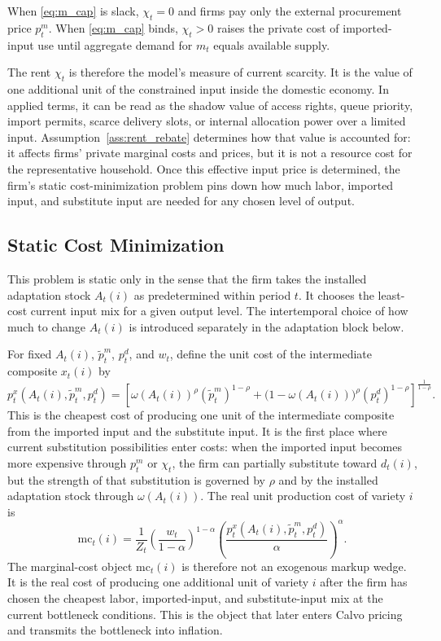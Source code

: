﻿\documentclass[12pt]{article}
\theoremstyle{remark}
\newcommand{\mc}{\mathrm{mc}}
\begin{document}
When \eqref{eq:m_cap} is slack, $\chi_t=0$ and firms pay only the external procurement price
$p_t^m$. When \eqref{eq:m_cap} binds, $\chi_t>0$ raises the private cost of imported-input use until
aggregate demand for $m_t$ equals available supply.

The rent $\chi_t$ is therefore the model's measure of current scarcity. It is the value of one
additional unit of the constrained input inside the domestic economy. In applied terms, it can be
read as the shadow value of access rights, queue priority, import permits, scarce delivery slots,
or internal allocation power over a limited input. Assumption~\ref{ass:rent_rebate} determines how
that value is accounted for: it affects firms' private marginal costs and prices, but it is not a
resource cost for the representative household. Once this effective input price is determined, the
firm's static cost-minimization problem pins down how much labor, imported input, and substitute
input are needed for any chosen level of output.

\subsection{Static Cost Minimization}

This problem is static only in the sense that the firm takes the installed adaptation stock
$A_t(i)$ as predetermined within period $t$. It chooses the least-cost current input mix for a given
output level. The intertemporal choice of how much to change $A_t(i)$ is introduced separately in
the adaptation block below.

For fixed $A_t(i)$, $\tilde p_t^m$, $p_t^d$, and $w_t$, define the unit cost of the intermediate
composite $x_t(i)$ by
\begin{equation}
    p_t^x(A_t(i),\tilde p_t^m,p_t^d)
    =
    \left[
        \omega(A_t(i))^\rho(\tilde p_t^m)^{1-\rho}
        +
        \bigl(1-\omega(A_t(i))\bigr)^\rho(p_t^d)^{1-\rho}
    \right]^{\frac{1}{1-\rho}}.
    \label{eq:px_dual}
\end{equation}
This is the cheapest cost of producing one unit of the intermediate composite from the imported
input and the substitute input. It is the first place where current substitution possibilities
enter costs: when the imported input becomes more expensive through $p_t^m$ or $\chi_t$, the
firm can partially substitute toward $d_t(i)$, but the strength of that substitution is governed by
$\rho$ and by the installed adaptation stock through $\omega(A_t(i))$.
The real unit production cost of variety $i$ is
\begin{equation}
    \mc_t(i)
    =
    \frac{1}{Z_t}
    \left(\frac{w_t}{1-\alpha}\right)^{1-\alpha}
    \left(\frac{p_t^x(A_t(i),\tilde p_t^m,p_t^d)}{\alpha}\right)^\alpha.
    \label{eq:unit_cost}
\end{equation}
The marginal-cost object $\mc_t(i)$ is therefore not an exogenous markup wedge. It is the real cost
of producing one additional unit of variety $i$ after the firm has chosen the cheapest labor,
imported-input, and substitute-input mix at the current bottleneck conditions. This is the object
that later enters Calvo pricing and transmits the bottleneck into inflation.
\end{document}
